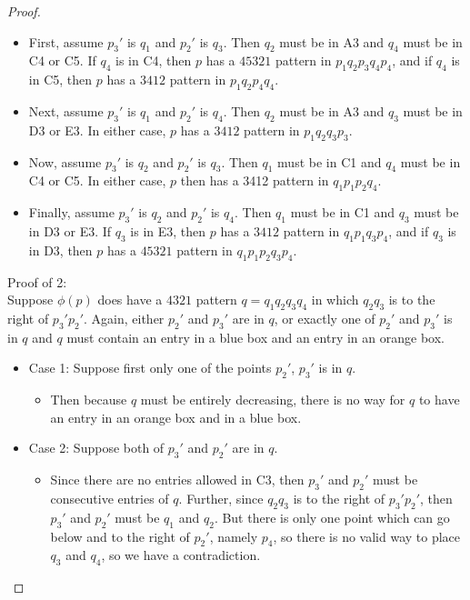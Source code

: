 \documentclass[11pt]{amsart}
\theoremstyle{remark}
\numberwithin{equation}{section}
\begin{document}
\begin{proof}
\begin{itemize}
        \begin{itemize}
            \item First, assume $p_3'$ is $q_1$ and $p_2'$ is $q_3$. Then $q_2$ must be in A3 and $q_4$ must be in C4 or C5.  If $q_4$ is in C4, then $p$ has a $45321$ pattern in $p_1q_2p_3q_4p_4$, and if $q_4$ is in C5, then $p$ has a $3412$ pattern in $p_1q_2p_4q_4$.
            \item Next, assume $p_3'$ is $q_1$ and $p_2'$ is $q_4$. Then $q_2$ must be in A3 and $q_3$ must be in D3 or E3. In either case, $p$ has a $3412$ pattern in $p_1q_2q_3p_3$.
            \item Now, assume $p_3'$ is $q_2$ and $p_2'$ is $q_3$. Then $q_1$ must be in C1 and $q_4$ must be in C4 or C5. In either case, $p$ then has a 3412 pattern in $q_1p_1p_2q_4$.
            \item Finally, assume $p_3'$ is $q_2$ and $p_2'$ is $q_4$. Then $q_1$ must be in C1 and $q_3$ must be in D3 or E3. If $q_3$ is in E3, then $p$ has a $3412$ pattern in $q_1p_1q_3p_4$, and if $q_3$ is in D3, then $p$ has a $45321$ pattern in $q_1p_1p_2q_3p_4$. 
        \end{itemize}
    \end{itemize}  

    \vspace{10pt}

    
    Proof of 2:
    \\
    Suppose $\phi(p)$ does have a $4321$ pattern $q=q_1q_2q_3q_4$ in which $q_2q_3$ is to the right of $p_3'p_2'$. Again, either $p_2'$ and $p_3'$ are in $q$, or exactly one of $p_2'$ and $p_3'$ is in $q$ and $q$ must contain an entry in a blue box and an entry in an orange box. 

    \begin{itemize}
        \item Case 1: Suppose first only one of the points $p_2'$, $p_3'$ is in $q$.
        \begin{itemize}
            \item Then because $q$ must be entirely decreasing, there is no way for $q$ to have an entry in an orange box and in a blue box. 
        \end{itemize}
        
        \item Case 2: Suppose both of $p_3'$ and $p_2'$ are in $q$. 
        \begin{itemize}
            \item Since there are no entries allowed in C3, then $p_3'$ and $p_2'$ must be consecutive entries of $q$. Further, since $q_2q_3$ is to the right of $p_3'p_2'$, then $p_3'$ and $p_2'$ must be $q_1$ and $q_2$. But there is only one point which can go below and to the right of $p_2'$, namely $p_4$, so there is no valid way to place $q_3$ and $q_4$, so we have a contradiction. 
        \end{itemize}
        

\end{itemize}
\end{proof}
\end{document}
